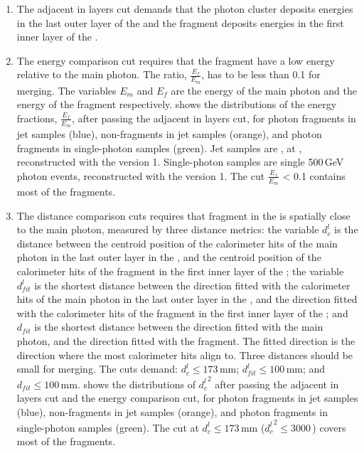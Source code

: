 \begin{enumerate}
  \item The adjacent in layers cut demands that the photon cluster deposits energies in the last outer layer of the \ECAL   and  the fragment deposits energies in the first inner layer of the \HCAL.
  \item
The energy comparison cut requires that the fragment have a low energy relative to the main photon. The ratio, $\frac{E_f}{E_m}$, has to be less than 0.1 for merging. The variables $E_m$ and $E_f$ are the energy of the main photon  and the energy of the fragment respectively.  shows the distributions of  the energy fractions, $\frac{E_f}{E_m}$, after passing the adjacent in layers cut, for photon fragments in jet samples (blue), non-fragments in jet samples (orange), and photon fragments in single-photon samples (green). Jet samples are \eeZuds, at , reconstructed with the \pandora version 1. Single-photon samples are single 500\,GeV photon events,  reconstructed with the \pandora version 1. The cut $\frac{E_f}{E_m}$ < 0.1 contains most of the fragments.
  \item
The distance comparison cuts requires that fragment in the \HCAL is spatially close to the main photon, measured by three distance metrics: the variable $d^l_c$ is the distance between the centroid position of the calorimeter hits of the main photon in the last outer layer in the \ECAL, and the centroid position of the calorimeter hits of the fragment in the first inner layer of the \HCAL; the variable $d^l_{fit}$ is the shortest distance between the direction fitted with the calorimeter hits of the main photon in the  last outer layer in the \ECAL, and the direction fitted with  the calorimeter hits of the fragment in the first inner layer of the \HCAL; and $d_{fit}$ is the shortest distance between the direction fitted with the main photon, and the direction fitted with the fragment. The fitted direction is the direction where the most calorimeter hits align to. Three distances should be small for merging. The cuts demand: $d^l_c \leqslant 173\,\text{mm}$; $d^l_{fit} \leqslant 100\,\text{mm}$; and $d_{fit} \leqslant 100\,\text{mm}$.   shows the distributions of ${d^l_c}^2$  after passing the adjacent in layers cut and the energy comparison cut, for photon fragments in jet samples (blue), non-fragments in jet samples (orange), and photon fragments in single-photon samples (green). The cut at  $d^l_c \leqslant 173$\,mm (${d^l_c}^2 \leqslant 3000$\,) covers most of the fragments.


\end{enumerate}
